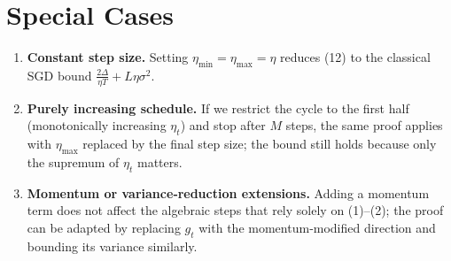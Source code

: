 \documentclass{article}
\begin{document}
\section*{Special Cases}
\begin{enumerate}[label=(\alph*)]
\item \textbf{Constant step size.} Setting $\eta_{\min}=\eta_{\max}=\eta$ reduces (12) to the classical SGD bound $\frac{2\Delta}{\eta T}+L\eta\sigma^{2}$.
\item \textbf{Purely increasing schedule.} If we restrict the cycle to the first half (monotonically increasing $\eta_t$) and stop after $M$ steps, the same proof applies with $\eta_{\max}$ replaced by the final step size; the bound still holds because only the supremum of $\eta_t$ matters.
\item \textbf{Momentum or variance‑reduction extensions.} Adding a momentum term does not affect the algebraic steps that rely solely on (1)–(2); the proof can be adapted by replacing $g_t$ with the momentum‑modified direction and bounding its variance similarly.
\end{enumerate}
\end{document}
